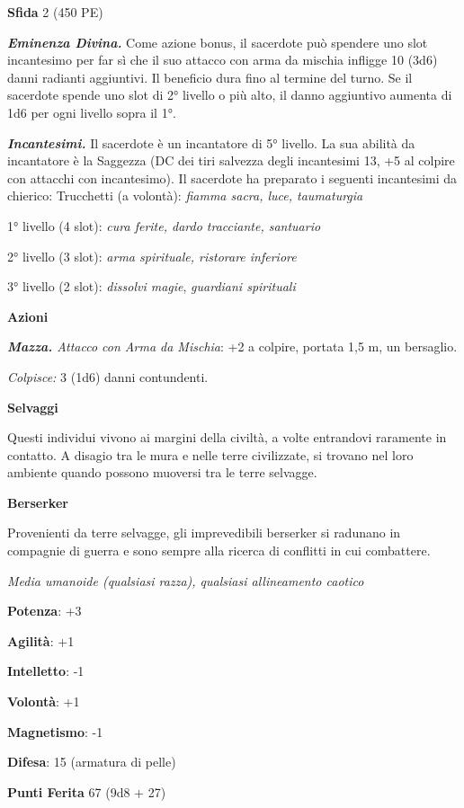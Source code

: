 \begin{multicols}{2}
\textbf{Sfida} 2 (450 PE)

\emph{\textbf{Eminenza Divina.}} Come azione bonus, il sacerdote può
spendere uno slot incantesimo per far sì che il suo attacco con arma da
mischia infligge 10 (3d6) danni radianti aggiuntivi. Il beneficio dura
fino al termine del turno. Se il sacerdote spende uno slot di 2° livello
o più alto, il danno aggiuntivo aumenta di 1d6 per ogni livello sopra il
1°.

\emph{\textbf{Incantesimi.}} Il sacerdote è un incantatore di 5°
livello. La sua abilità da incantatore è la Saggezza (DC dei tiri
salvezza degli incantesimi 13, +5 al colpire con attacchi con
incantesimo). Il sacerdote ha preparato i seguenti incantesimi da
chierico: Trucchetti (a volontà): \emph{fiamma sacra, luce, taumaturgia}

1° livello (4 slot): \emph{cura ferite, dardo tracciante, santuario}

2° livello (3 slot): \emph{arma spirituale, ristorare inferiore}

3° livello (2 slot): \emph{dissolvi magie}, \emph{guardiani spirituali}

\textbf{Azioni}

\emph{\textbf{Mazza.} Attacco con Arma da Mischia}: +2 a colpire,
portata 1,5 m, un bersaglio.

\emph{Colpisce:} 3 (1d6) danni contundenti.



\textbf{Selvaggi}

Questi individui vivono ai margini della civiltà, a volte entrandovi
raramente in contatto. A disagio tra le mura e nelle terre civilizzate,
si trovano nel loro ambiente quando possono muoversi tra le terre
selvagge.

\textbf{Berserker}

Provenienti da terre selvagge, gli imprevedibili berserker si radunano
in compagnie di guerra e sono sempre alla ricerca di conflitti in cui
combattere.

\emph{Media umanoide (qualsiasi razza), qualsiasi allineamento caotico}

\textbf{Potenza}: +3

\textbf{Agilità}: +1

\textbf{Intelletto}: -1

\textbf{Volontà}: +1

\textbf{Magnetismo}: -1

\textbf{Difesa}: 15 (armatura di pelle)

\textbf{Punti Ferita} 67 (9d8 + 27)


\end{multicols}
